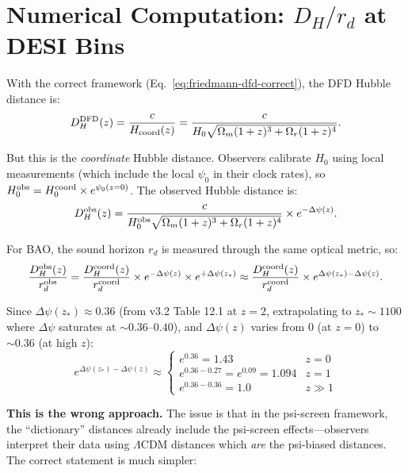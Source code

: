 \documentclass[11pt,a4paper]{article}
\newcommand{\Omm}{\Omega_m}
\newcommand{\LCDM}{$\Lambda$CDM}
\newcommand{\Dpsi}{\Delta\psi}
\begin{document}
\section{Numerical Computation: $D_H/r_d$ at DESI Bins}
\label{sec:dh-numerical}

With the correct framework (Eq.~\ref{eq:friedmann-dfd-correct}),
the DFD Hubble distance is:
\begin{equation}
D_H^{\rm DFD}(z) = \frac{c}{H_{\rm coord}(z)}
= \frac{c}{H_0\sqrt{\Omm(1+z)^3 + \Omega_r(1+z)^4}}.
\end{equation}

But this is the \emph{coordinate} Hubble distance.  Observers
calibrate $H_0$ using local measurements (which include the local
$\psi_0$ in their clock rates), so $H_0^{\rm obs} = H_0^{\rm coord}
\times e^{\psi_0(z=0)}$.  The observed Hubble distance is:
\begin{equation}
D_H^{\rm obs}(z) = \frac{c}{H_0^{\rm obs}\sqrt{\Omm(1+z)^3 +
\Omega_r(1+z)^4}} \times e^{-\Dpsi(z)}.
\end{equation}

For BAO, the sound horizon $r_d$ is measured through the same
optical metric, so:
\begin{equation}
\frac{D_H^{\rm obs}(z)}{r_d^{\rm obs}} = \frac{D_H^{\rm coord}(z)}
{r_d^{\rm coord}} \times e^{-\Dpsi(z)} \times e^{+\Dpsi(z_*)}
\approx \frac{D_H^{\rm coord}(z)}{r_d^{\rm coord}} \times
e^{\Dpsi(z_*) - \Dpsi(z)}.
\end{equation}

Since $\Dpsi(z_*) \approx 0.36$ (from v3.2 Table 12.1 at $z = 2$,
extrapolating to $z_* \sim 1100$ where $\Dpsi$ saturates at
$\sim 0.36$--$0.40$), and $\Dpsi(z)$ varies from $0$ (at $z=0$)
to $\sim 0.36$ (at high $z$):
\begin{equation}
e^{\Dpsi(z_*) - \Dpsi(z)} \approx
\begin{cases}
e^{0.36} = 1.43 & z = 0 \\
e^{0.36 - 0.27} = e^{0.09} = 1.094 & z = 1 \\
e^{0.36 - 0.36} = 1.0 & z \gg 1
\end{cases}
\end{equation}

\textbf{This is the wrong approach.}  The issue is that in the
psi-screen framework, the ``dictionary'' distances already include
the psi-screen effects---observers interpret their data using
\LCDM{} distances which \emph{are} the psi-biased distances.  The
correct statement is much simpler:
\end{document}
